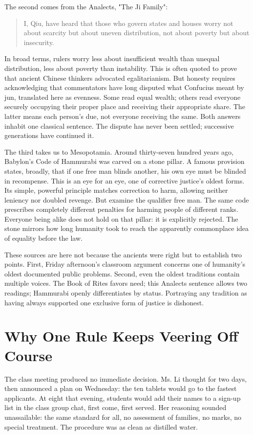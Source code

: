 The second comes from the Analects, "The Ji Family":

\begin{quote}
I, Qiu, have heard that those who govern states and houses worry not about scarcity but about uneven distribution, not about poverty but about insecurity.
\end{quote}
In broad terms, rulers worry less about insufficient wealth than unequal distribution, less about poverty than instability. This is often quoted to prove that ancient Chinese thinkers advocated egalitarianism. But honesty requires acknowledging that commentators have long disputed what Confucius meant by jun, translated here as evenness. Some read equal wealth; others read everyone securely occupying their proper place and receiving their appropriate share. The latter means each person's due, not everyone receiving the same. Both answers inhabit one classical sentence. The dispute has never been settled; successive generations have continued it.

The third takes us to Mesopotamia. Around thirty-seven hundred years ago, Babylon's Code of Hammurabi was carved on a stone pillar. A famous provision states, broadly, that if one free man blinds another, his own eye must be blinded in recompense. This is an eye for an eye, one of corrective justice's oldest forms. Its simple, powerful principle matches correction to harm, allowing neither leniency nor doubled revenge. But examine the qualifier free man. The same code prescribes completely different penalties for harming people of different ranks. Everyone being alike does not hold on that pillar: it is explicitly rejected. The stone mirrors how long humanity took to reach the apparently commonplace idea of equality before the law.

These sources are here not because the ancients were right but to establish two points. First, Friday afternoon's classroom argument concerns one of humanity's oldest documented public problems. Second, even the oldest traditions contain multiple voices. The Book of Rites favors need; this Analects sentence allows two readings; Hammurabi openly differentiates by status. Portraying any tradition as having always supported one exclusive form of justice is dishonest.

\section{Why One Rule Keeps Veering Off Course}
The class meeting produced no immediate decision. Ms. Li thought for two days, then announced a plan on Wednesday: the ten tablets would go to the fastest applicants. At eight that evening, students would add their names to a sign-up list in the class group chat, first come, first served. Her reasoning sounded unassailable: the same standard for all, no assessment of families, no marks, no special treatment. The procedure was as clean as distilled water.

